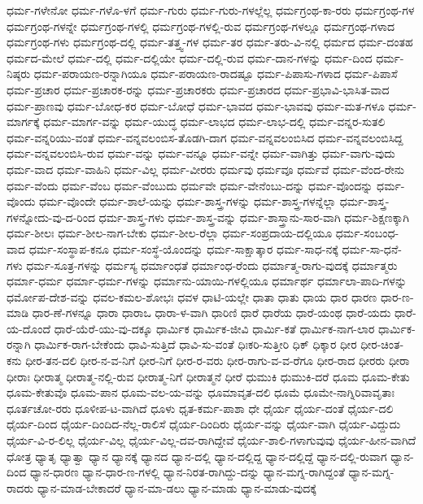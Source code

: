{ಧರ್ಮ-ಗಳೇನೋ
ಧರ್ಮ-ಗಳೊ-ಳಗೆ
ಧರ್ಮ-ಗುರು
ಧರ್ಮ-ಗುರು-ಗಳಲ್ಲೆಲ್ಲ
ಧರ್ಮಗ್ರಂಥ-ಕಾ-ರರು
ಧರ್ಮಗ್ರಂಥ-ಗಳ
ಧರ್ಮಗ್ರಂಥ-ಗಳನ್ನೇ
ಧರ್ಮಗ್ರಂಥ-ಗಳಲ್ಲಿ
ಧರ್ಮಗ್ರಂಥ-ಗಳಲ್ಲಿ-ರುವ
ಧರ್ಮಗ್ರಂಥ-ಗಳಲ್ಲೂ
ಧರ್ಮಗ್ರಂಥ-ಗಳಾದ
ಧರ್ಮಗ್ರಂಥ-ಗಳು
ಧರ್ಮಗ್ರಂಥ-ದಲ್ಲಿ
ಧರ್ಮ-ತತ್ತ್ವ-ಗಳ
ಧರ್ಮ-ತರ
ಧರ್ಮ-ತರು-ವಿ-ನಲ್ಲಿ
ಧರ್ಮದ
ಧರ್ಮ-ದಂತಹ
ಧರ್ಮದ-ಮೇಲೆ
ಧರ್ಮ-ದಲ್ಲಿ
ಧರ್ಮ-ದಲ್ಲಿಯೇ
ಧರ್ಮ-ದಲ್ಲಿ-ರುವ
ಧರ್ಮ-ದಾನ-ಗಳನ್ನು
ಧರ್ಮ-ದಿಂದ
ಧರ್ಮ-ನಿಷ್ಠರು
ಧರ್ಮ-ಪರಾಯಣ-ರನ್ನಾಗಿಯೂ
ಧರ್ಮ-ಪರಾಯಣ-ರಾದಷ್ಟೂ
ಧರ್ಮ-ಪಿಪಾಸು-ಗಳಾದ
ಧರ್ಮ-ಪಿಪಾಸೆ
ಧರ್ಮ-ಪ್ರಚಾರ
ಧರ್ಮ-ಪ್ರಚಾರಕ-ರನ್ನು
ಧರ್ಮ-ಪ್ರಚಾರಕರು
ಧರ್ಮ-ಪ್ರಚಾರದ
ಧರ್ಮ-ಪ್ರಭಾವಿ-ಭಾಸಿತ-ವಾದ
ಧರ್ಮ-ಪ್ರಾಣವು
ಧರ್ಮ-ಬೋಧ-ಕರ
ಧರ್ಮ-ಬೋಧೆ
ಧರ್ಮ-ಭಾವದ
ಧರ್ಮ-ಭಾವವು
ಧರ್ಮ-ಮತ-ಗಳೂ
ಧರ್ಮ-ಮಾರ್ಗಕ್ಕೆ
ಧರ್ಮ-ಮಾರ್ಗ-ವನ್ನು
ಧರ್ಮ-ಯುದ್ಧ
ಧರ್ಮ-ಲಾಭದ
ಧರ್ಮ-ಲಾಭ-ದಲ್ಲಿ
ಧರ್ಮ-ವನ್ನರ-ಸುತಲಿ
ಧರ್ಮ-ವನ್ನರಿಯು-ವಂತೆ
ಧರ್ಮ-ವನ್ನವಲಂಬಿಸ-ತೊಡಗಿ-ದಾಗ
ಧರ್ಮ-ವನ್ನವಲಂಬಿಸಿದ
ಧರ್ಮ-ವನ್ನವಲಂಬಿಸಿದ್ದ
ಧರ್ಮ-ವನ್ನವಲಂಬಿಸಿ-ರುವ
ಧರ್ಮ-ವನ್ನು
ಧರ್ಮ-ವನ್ನೂ
ಧರ್ಮ-ವನ್ನೇ
ಧರ್ಮ-ವಾಗಿತ್ತು
ಧರ್ಮ-ವಾಗು-ವುದು
ಧರ್ಮ-ವಾದ
ಧರ್ಮ-ವಾಹಿನಿ
ಧರ್ಮ-ವಿಲ್ಲ
ಧರ್ಮ-ವೀರರು
ಧರ್ಮವು
ಧರ್ಮವೂ
ಧರ್ಮವೆ
ಧರ್ಮ-ವೆಂದ-ರೇನು
ಧರ್ಮ-ವೆಂದು
ಧರ್ಮ-ವೆಂಬ
ಧರ್ಮ-ವೆಂಬುದು
ಧರ್ಮವೇ
ಧರ್ಮ-ವೇನೆಂಬು-ದನ್ನು
ಧರ್ಮ-ವೊಂದನ್ನು
ಧರ್ಮ-ವೊಂದು
ಧರ್ಮ-ವೊಂದೇ
ಧರ್ಮ-ಶಾಲೆ-ಯನ್ನು
ಧರ್ಮ-ಶಾಸ್ತ್ರ-ಗಳನ್ನು
ಧರ್ಮ-ಶಾಸ್ತ್ರ-ಗಳನ್ನೆಲ್ಲಾ
ಧರ್ಮ-ಶಾಸ್ತ್ರ-ಗಳನ್ನೋದು-ವು-ದ-ರಿಂದ
ಧರ್ಮ-ಶಾಸ್ತ್ರ-ಗಳು
ಧರ್ಮ-ಶಾಸ್ತ್ರ-ವನ್ನು
ಧರ್ಮ-ಶಾಸ್ತ್ರಾನು-ಸಾರ-ವಾಗಿ
ಧರ್ಮ-ಶಿಕ್ಷಣಕ್ಕಾಗಿ
ಧರ್ಮ-ಶೀಲಃ
ಧರ್ಮ-ಶೀಲ-ನಾಗ-ಬೇಕು
ಧರ್ಮ-ಶೀಲ-ರೆಲ್ಲಾ
ಧರ್ಮ-ಸಂಪ್ರದಾಯ-ದಲ್ಲಿಯೂ
ಧರ್ಮ-ಸಂಬಂಧ-ವಾದ
ಧರ್ಮ-ಸಂಸ್ಥಾಪ-ಕನೂ
ಧರ್ಮ-ಸಂಸ್ಥೆ-ಯೊಂದನ್ನು
ಧರ್ಮ-ಸಾಕ್ಷಾತ್ಕಾರ
ಧರ್ಮ-ಸಾಧ-ನಕ್ಕೆ
ಧರ್ಮ-ಸಾ-ಧನೆ-ಗಳು
ಧರ್ಮ-ಸೂತ್ರ-ಗಳನ್ನು
ಧರ್ಮಸ್ಯ
ಧರ್ಮಾಂಧತೆ
ಧರ್ಮಾಂಧ-ರೆಂದು
ಧರ್ಮಾತ್ಮ-ರಾಗು-ವುದಕ್ಕೆ
ಧರ್ಮಾತ್ಮರು
ಧರ್ಮಾ-ಧರ್ಮ
ಧರ್ಮಾ-ಧರ್ಮ-ಗಳನ್ನು
ಧರ್ಮಾನು-ಯಾಯಿ-ಗಳಲ್ಲಿಯೂ
ಧರ್ಮಾರ್ಥ
ಧರ್ಮಾಲಾ-ಪಾದಿ-ಗಳನ್ನು
ಧರ್ಮೋಪ-ದೇಶ-ವನ್ನು
ಧವಲ-ಕಮಲ-ಶೋಭಃ
ಧವಳ
ಧಾಟಿ-ಯಲ್ಲೇ
ಧಾತಾ
ಧಾತು
ಧಾಯ
ಧಾರ
ಧಾರಣ
ಧಾರ-ಣ-ಮಾಡಿ
ಧಾರ-ಣೆ-ಗಳನ್ನೂ
ಧಾರಾ
ಧಾರಾಒ
ಧಾರಾ-ಳ-ವಾಗಿ
ಧಾರಿಣಿ
ಧಾರೆ
ಧಾರೆಯ
ಧಾರೆ-ಯಂಥ
ಧಾರೆ-ಯದು
ಧಾರೆ-ಯ-ದೊಂದೆ
ಧಾರೆ-ಯೆರೆ-ಯು-ವು-ದಕ್ಕೂ
ಧಾರ್ಮಿಕ
ಧಾರ್ಮಿಕ-ಜೀವಿ
ಧಾರ್ಮಿ-ಕತೆ
ಧಾರ್ಮಿಕ-ನಾಗ-ಲಾರ
ಧಾರ್ಮಿಕ-ರನ್ನಾಗಿ
ಧಾರ್ಮಿಕ-ರಾಗ-ಬೇಕೆಂದು
ಧಾವಿ-ಸುತ್ತಿದೆ
ಧಾವಿ-ಸು-ವಂತೆ
ಧಿಃಕರಿ-ಸುತ್ತೀರಿ
ಧಿಕ್
ಧಿಕ್ಕಾರ
ಧೀರ
ಧೀರ-ಚಿಂತ-ಕನು
ಧೀರ-ತನ-ದಲಿ
ಧೀರ-ನ-ವ-ನಿಗೆ
ಧೀರ-ನಿಗೆ
ಧೀರ-ರ-ವರು
ಧೀರ-ರಾಗು-ವ-ವ-ರೆಗೂ
ಧೀರ-ರಾದ
ಧೀರರು
ಧೀರಾ
ಧೀರಾಃ
ಧೀರಾತ್ಮ
ಧೀರಾತ್ಮ-ನಲ್ಲಿ-ರುವ
ಧೀರಾತ್ಮ-ನಿಗೆ
ಧೀರಾತ್ಮನೆ
ಧೀರೆ
ಧುಮುಕಿ
ಧುಮುಕಿ-ದರೆ
ಧೂಮ
ಧೂಮ-ಕೇತು
ಧೂಮ-ಕೇತುವೊ
ಧೂಮ-ಪಾನ
ಧೂಮ-ವಲ-ಯ-ವನ್ನು
ಧೂಮಾವೃತ-ದಲಿ
ಧೂಮೆ
ಧೂಮೇ-ನಾಗ್ನಿರಿವಾವೃತಾಃ
ಧೂರ್ತಚೋ-ರರು
ಧೂಳೀಪ-ಟ-ವಾಗಿದೆ
ಧೂಳು
ಧೃತ-ಕರ್ಮ-ಪಾಶಾ
ಧೇ
ಧೈರ್ಯ
ಧೈರ್ಯ-ದಂತೆ
ಧೈರ್ಯ-ದಲಿ
ಧೈರ್ಯ-ದಿಂದ
ಧೈರ್ಯ-ದಿಂದಿದ-ನೆಲ್ಲ-ರಾಲಿಸೆ
ಧೈರ್ಯ-ದಿಂದಿರು
ಧೈರ್ಯ-ವನ್ನು
ಧೈರ್ಯ-ವಾಗಿ
ಧೈರ್ಯ-ವಿದ್ದುದು
ಧೈರ್ಯ-ವಿ-ರ-ಲಿಲ್ಲ
ಧೈರ್ಯ-ವಿಲ್ಲ
ಧೈರ್ಯ-ವಿಲ್ಲ-ದವ-ರಾಗಿದ್ದೇವೆ
ಧೈರ್ಯ-ಶಾಲಿ-ಗಳಾಗುವುವು
ಧೈರ್ಯ-ಹೀನ-ವಾಗಿದೆ
ಧೋತ್ರ
ಧ್ಯಾತೃ
ಧ್ಯಾತ್ವಾ
ಧ್ಯಾನ
ಧ್ಯಾನಕ್ಕೆ
ಧ್ಯಾನದ
ಧ್ಯಾನ-ದಲ್ಲಿ
ಧ್ಯಾನ-ದಲ್ಲಿದ್ದ
ಧ್ಯಾನ-ದಲ್ಲಿದ್ದೆ
ಧ್ಯಾನ-ದಲ್ಲಿ-ರುವಾಗ
ಧ್ಯಾನ-ದಿಂದ
ಧ್ಯಾನ-ಧಾರಣ
ಧ್ಯಾನ-ಧಾರ-ಣ-ಗಳಲ್ಲಿ
ಧ್ಯಾನ-ನಿರತ-ರಾಗಿದ್ದು-ದನ್ನು
ಧ್ಯಾನ-ಮಗ್ನ-ರಾಗಿದ್ದಂತೆ
ಧ್ಯಾನ-ಮಗ್ನ-ರಾದರು
ಧ್ಯಾನ-ಮಾಡ-ಬೇಕಾದರೆ
ಧ್ಯಾನ-ಮಾ-ಡಲು
ಧ್ಯಾನ-ಮಾಡು
ಧ್ಯಾನ-ಮಾಡು-ವುದಕ್ಕೆ
}
